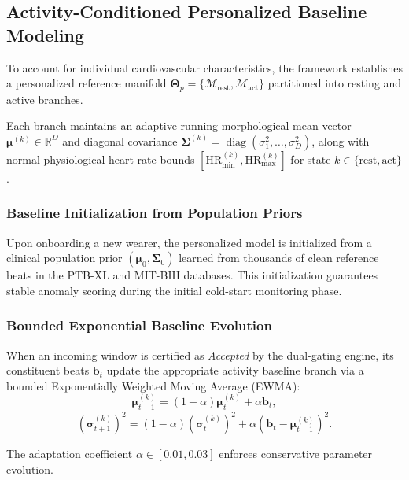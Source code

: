 \documentclass{ieeeaccess}
\begin{document}
\subsection{Activity-Conditioned Personalized Baseline Modeling}
To account for individual cardiovascular characteristics, the framework establishes a personalized reference manifold $\mathbf{\Theta}_p = \{\mathcal{M}_{\mathrm{rest}}, \mathcal{M}_{\mathrm{act}}\}$ partitioned into resting and active branches.

Each branch maintains an adaptive running morphological mean vector $\mathbf{\mu}^{(k)} \in \mathbb{R}^D$ and diagonal covariance $\mathbf{\Sigma}^{(k)} = \operatorname{diag}(\sigma_1^2, \dots, \sigma_D^2)$, along with normal physiological heart rate bounds $[\mathrm{HR}_{\min}^{(k)}, \mathrm{HR}_{\max}^{(k)}]$ for state $k \in \{\text{rest}, \text{act}\}$.

\subsubsection{Baseline Initialization from Population Priors}
Upon onboarding a new wearer, the personalized model is initialized from a clinical population prior $(\mathbf{\mu}_0, \mathbf{\Sigma}_0)$ learned from thousands of clean reference beats in the PTB-XL and MIT-BIH databases. This initialization guarantees stable anomaly scoring during the initial cold-start monitoring phase.

\subsubsection{Bounded Exponential Baseline Evolution}
When an incoming window is certified as \textit{Accepted} by the dual-gating engine, its constituent beats $\mathbf{b}_t$ update the appropriate activity baseline branch via a bounded Exponentially Weighted Moving Average (EWMA):
\begin{equation}
\label{eq:ewma_mean}
\mathbf{\mu}_{t+1}^{(k)} = (1 - \alpha)\mathbf{\mu}_t^{(k)} + \alpha \mathbf{b}_t,
\end{equation}
\begin{equation}
\label{eq:ewma_var}
(\mathbf{\sigma}_{t+1}^{(k)})^2 = (1 - \alpha)(\mathbf{\sigma}_t^{(k)})^2 + \alpha (\mathbf{b}_t - \mathbf{\mu}_{t+1}^{(k)})^2.
\end{equation}

The adaptation coefficient $\alpha \in [0.01, 0.03]$ enforces conservative parameter evolution. 
\end{document}
